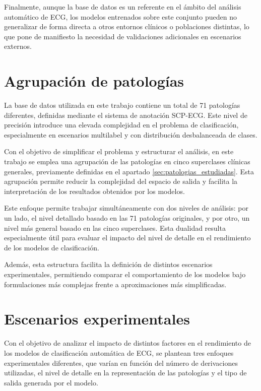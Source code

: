 \documentclass[12pt,a4paper,twoside]{book}
\begin{document}
Finalmente, aunque la base de datos es un referente en el ámbito del análisis automático de ECG, los modelos entrenados sobre este conjunto pueden no generalizar de forma directa a otros entornos clínicos o poblaciones distintas, lo que pone de manifiesto la necesidad de validaciones adicionales en escenarios externos.

\section{Agrupación de patologías}

La base de datos utilizada en este trabajo contiene un total de 71 patologías diferentes, definidas mediante el sistema de anotación SCP-ECG.
Este nivel de precisión introduce una elevada complejidad en el problema de clasificación, especialmente en escenarios multilabel y con distribución desbalanceada de clases.

Con el objetivo de simplificar el problema y estructurar el análisis, en este trabajo se emplea una agrupación de las patologías en cinco superclases clínicas generales, previamente definidas en el apartado \ref{sec:patologias_estudiadas}. 
Esta agrupación permite reducir la complejidad del espacio de salida y facilita la interpretación de los resultados obtenidos por los modelos.

Este enfoque permite trabajar simultáneamente con dos niveles de análisis: por un lado, el nivel detallado basado en las 71 patologías originales, y por otro, un nivel más general basado en las cinco superclases. 
Esta dualidad resulta especialmente útil para evaluar el impacto del nivel de detalle en el rendimiento de los modelos de clasificación.

Además, esta estructura facilita la definición de distintos escenarios experimentales, permitiendo comparar el comportamiento de los modelos bajo formulaciones más complejas frente a aproximaciones más simplificadas.

\section{Escenarios experimentales}

Con el objetivo de analizar el impacto de distintos factores en el rendimiento de los modelos de clasificación automática de ECG, se plantean tres enfoques experimentales diferentes, que varían en función del número de derivaciones utilizadas, el nivel de detalle en la representación de las patologías y el tipo de salida generada por el modelo.
\end{document}

